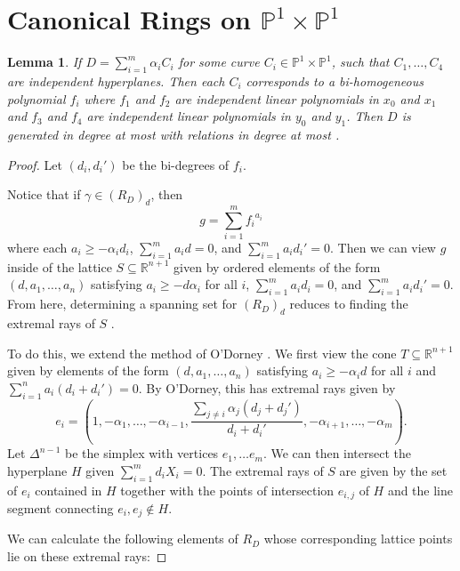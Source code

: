 \documentclass{amsart}
\theoremstyle{plain}
\newtheorem{lem}[thm]{Lemma}
\theoremstyle{definition}
\theoremstyle{remark}
\numberwithin{equation}{section}
\newcommand\bp{{\mathbb P}}
\begin{document}
\section{Canonical Rings on \texorpdfstring{$\bp^1 \times \bp^1$}{}}
\begin{lem}
If $D=\sum_{i=1}^m \alpha_i C_i$ for some curve $C_i\in \mathbb{P}^1\times \mathbb{P}^1$, such that $C_1, \ldots, C_4$ are independent hyperplanes.  Then each $C_i$ corresponds to a bi-homogeneous polynomial $f_i$ where $f_1$ and $f_2$ are independent linear polynomials in $x_0$ and $x_1$ and $f_3$ and $f_4$ are independent linear polynomials in $y_0$ and $y_1$.  Then $D$ is generated in degree at most  with relations in degree at most .
\end{lem}
\begin{proof}
Let $(d_i, d_i')$ be the bi-degrees of $f_i$. 

Notice that if $\gamma \in (R_D)_d$, then 
\[
	g = \sum_{i=1}^m {f_i}^{a_i}
\]
where each $a_i \ge - \alpha_i d_i$, $\sum_{i=1}^m a_i d = 0$, and $\sum_{i=1}^m a_i d_i' = 0$.  Then we can view $g$ inside of the lattice
$S\subseteq \mathbb{R}^{n+1}$ given by ordered elements of the form $(d, a_1, \ldots, a_n)$ satisfying $a_i \ge - d \alpha_i$ for all $i$, $\sum_{i=1}^m a_i d_i = 0$, and $\sum_{i=1}^m a_i d_i' = 0$. 
From here, determining a spanning set for $(R_D)_d$ reduces to finding the extremal rays of $S$ .  

To do this, we extend the method of O'Dorney .  We first view the cone $T\subseteq \mathbb{R}^{n+1}$ given by elements of the form $(d, a_1, \ldots, a_n)$ satisfying $a_i \ge -\alpha_i d$ for all $i$ and $\sum_{i=1}^n a_i (d_i + d_i') =0$.  By O'Dorney, this has extremal rays given by 
\[
	e_i = (1, -\alpha_1, \ldots, -\alpha_{i-1}, \frac{\sum_{j \ne i} \alpha_j(d_j+ d_j')}{d_i + d_i'}, -\alpha_{i+1}, \ldots, - \alpha_m).
\]
Let $\Delta^{n-1}$ be the simplex with vertices $e_1, \ldots e_m$.  We can then intersect the hyperplane $H$ given $\sum_{i=1}^m  d_i X_i = 0$.  The extremal rays of $S$ are given by the set of $e_i$ contained in $H$ together with the points of intersection $e_{i,j}$ of $H$ and the line segment connecting $e_i, e_j \not \in H$.

 We can calculate the following elements of $R_D$ whose corresponding lattice points lie on these extremal rays:


\end{proof}
\end{document}
